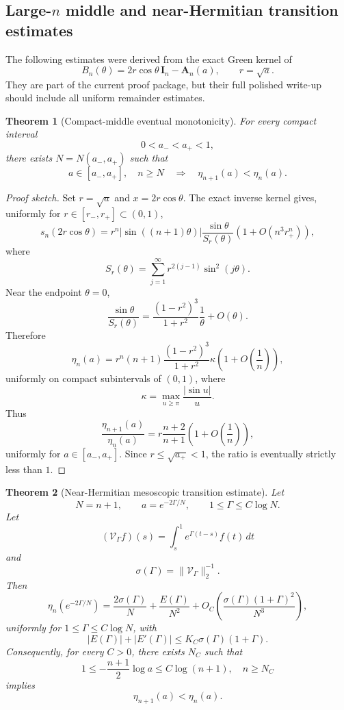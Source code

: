 \documentclass[11pt]{article}
\numberwithin{equation}{section}
\newtheorem{theorem}{Theorem}[section]
\begin{document}
\subsection{\texorpdfstring{Large-\(n\) middle and near-Hermitian transition estimates}{Large-n middle and near-Hermitian transition estimates}}

The following estimates were derived from the exact Green kernel of
\[
B_n(\theta)=2r\cos\theta\,\mathbf I_n-\mathbf A_n(a),
\qquad r=\sqrt a.
\]
They are part of the current proof package, but their full polished write-up should
include all uniform remainder estimates.

\begin{theorem}[Compact-middle eventual monotonicity]
\label{thm:compact-middle}
For every compact interval
\[
0<a_-<a_+<1,
\]
there exists \(N=N(a_-,a_+)\) such that
\[
a\in[a_-,a_+],\quad n\ge N
\quad\Longrightarrow\quad
\eta_{n+1}(a)<\eta_n(a).
\]
\end{theorem}

\begin{proof}[Proof sketch]
Set \(r=\sqrt a\) and \(x=2r\cos\theta\). The exact inverse kernel gives, uniformly for
\(r\in[r_-,r_+]\subset(0,1)\),
\[
s_n(2r\cos\theta)
=
r^n|\sin((n+1)\theta)|
\frac{\sin\theta}{S_r(\theta)}
\left(1+O(n^3r_+^n)\right),
\]
where
\[
S_r(\theta)=\sum_{j=1}^{\infty}r^{2(j-1)}\sin^2(j\theta).
\]
Near the endpoint \(\theta=0\),
\[
\frac{\sin\theta}{S_r(\theta)}
=
\frac{(1-r^2)^3}{1+r^2}\frac1\theta+O(\theta).
\]
Therefore
\[
\eta_n(a)
=
r^n(n+1)
\frac{(1-r^2)^3}{1+r^2}
\kappa
\left(1+O\!\left(\frac1n\right)\right),
\]
uniformly on compact subintervals of \((0,1)\), where
\[
\kappa=\max_{u\ge\pi}\frac{|\sin u|}{u}.
\]
Thus
\[
\frac{\eta_{n+1}(a)}{\eta_n(a)}
=
r\frac{n+2}{n+1}\left(1+O\!\left(\frac1n\right)\right),
\]
uniformly for \(a\in[a_-,a_+]\). Since \(r\le\sqrt{a_+}<1\), the ratio is eventually
strictly less than \(1\).
\end{proof}

\begin{theorem}[Near-Hermitian mesoscopic transition estimate]
\label{thm:mesoscopic}
Let
\[
N=n+1,\qquad
a=e^{-2\Gamma/N},
\qquad
1\le\Gamma\le C\log N.
\]
Let
\[
(\mathcal V_\Gamma f)(s)
=
\int_s^1 e^{\Gamma(t-s)}f(t)\,dt
\]
and
\[
\sigma(\Gamma)=\|\mathcal V_\Gamma\|_2^{-1}.
\]
Then
\[
\eta_n(e^{-2\Gamma/N})
=
\frac{2\sigma(\Gamma)}{N}
+
\frac{E(\Gamma)}{N^2}
+
O_C\!\left(\frac{\sigma(\Gamma)(1+\Gamma)^2}{N^3}\right),
\]
uniformly for \(1\le\Gamma\le C\log N\), with
\[
|E(\Gamma)|+|E'(\Gamma)|
\le
K_C\sigma(\Gamma)(1+\Gamma).
\]
Consequently, for every \(C>0\), there exists \(N_C\) such that
\[
1\le -\frac{n+1}{2}\log a\le C\log(n+1),\quad n\ge N_C
\]
implies
\[
\eta_{n+1}(a)<\eta_n(a).
\]
\end{theorem}
\end{document}
